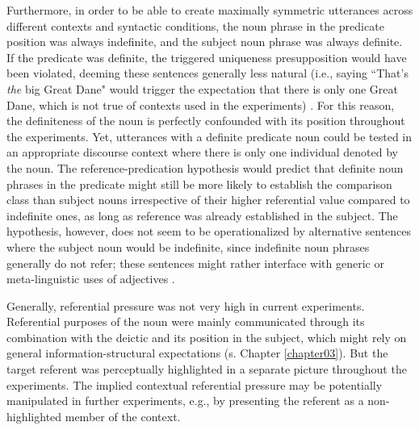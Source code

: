Furthermore, in order to be able to create maximally symmetric utterances across different contexts and syntactic conditions, the noun phrase in the predicate position was always indefinite, and the subject noun phrase was always definite. If the predicate was definite, the triggered uniqueness presupposition would have been violated, deeming these sentences generally less natural (i.e., saying ``That's \emph{the} big Great Dane" would trigger the expectation that there is only one Great Dane, which is not true of contexts used in the experiments) \parencite[cf.][]{syrett2010meaning}. 
For this reason, the definiteness of the noun is perfectly confounded with its position throughout the experiments. Yet, utterances with a definite predicate noun could be tested in an appropriate discourse context where there is only one individual denoted by the noun. The reference-predication hypothesis would predict that definite noun phrases in the predicate might still be more likely to establish the comparison class than subject nouns irrespective of their higher referential value compared to indefinite ones, as long as reference was already established in the subject. 
The hypothesis, however, does not seem to be operationalized by alternative sentences where the subject noun would be indefinite, since indefinite noun phrases generally do not refer; these sentences might rather interface with generic or meta-linguistic uses of adjectives \parencite{Reboul2001, tessler2019language, barker2002dynamics}. 

Generally, referential pressure was not very high in current experiments. Referential purposes of the noun were mainly communicated through its combination with the deictic and its position in the subject, which might rely on general information-structural expectations (s. Chapter \ref{chapter03}). But the target referent was perceptually highlighted in a separate picture throughout the experiments. The implied contextual referential pressure may be potentially manipulated in further experiments, e.g., by presenting the referent as a non-highlighted member of the context. 

